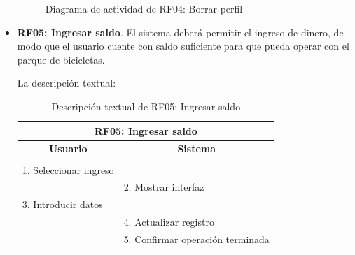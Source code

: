 \begin{itemize}
	\begin{figure}[!htb]
		\centering
		\caption{Diagrama de actividad de RF04: Borrar perfil}
		\label{fig:diagramaActividad_RF04}
	\end{figure}
	
	\FloatBarrier
	\item \textbf{RF05: Ingresar saldo}. El sistema deberá permitir el ingreso de dinero, de modo que el usuario cuente con saldo suficiente para que pueda operar con el parque de bicicletas.
	
	La descripción textual:
	
	\begin{table}[h]
		\centering	
		\begin{tabular}{|l|l|}
			\hline
			\multicolumn{2}{|c|}{\textbf{RF05: Ingresar saldo}} \\ \hline
			\multicolumn{1}{|c|}{\textbf{Usuario}} & \multicolumn{1}{c|}{\textbf{Sistema}} \\ \hline
			[Pto. inclusión: RF02: Loguear usuario] &\\ \hline
			1. Seleccionar ingreso &\\ \hline
			& 2. Mostrar interfaz \\ \hline
			3. Introducir datos &\\ \hline
			& 4. Actualizar registro \\ \hline
			& 5. Confirmar operación terminada \\ \hline 	
		\end{tabular}
		\caption{Descripción textual de RF05: Ingresar saldo}
		\label{tab:tablaDescTextualRF05}
	\end{table}
	

\end{itemize}
